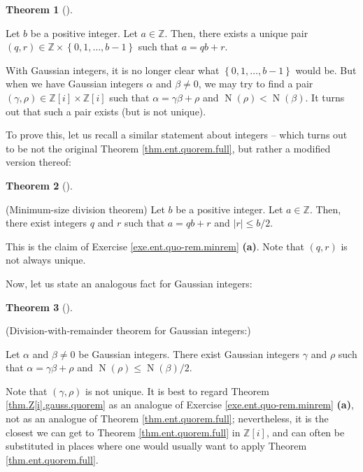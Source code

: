 \documentclass[numbers=enddot,12pt,final,onecolumn,notitlepage]{scrartcl}%
\numberwithin{exer}{subsection}
\theoremstyle{definition}
\newtheorem{theo}{Theorem}[subsection]
\newenvironment{theorem}[1][]
{\begin{theo}[#1]\begin{leftbar}}
{\end{leftbar}\end{theo}}
\begin{document}
\begin{theorem}
Let $b$ be a positive integer. Let $a\in\mathbb{Z}$. Then, there exists a
unique pair $\left(  q,r\right)  \in\mathbb{Z}\times\left\{  0,1,\ldots
,b-1\right\}  $ such that $a=qb+r$.
\end{theorem}

With Gaussian integers, it is no longer clear what $\left\{  0,1,\ldots
,b-1\right\}  $ would be. But when we have Gaussian integers $\alpha$ and
$\beta\neq0$, we may try to find a pair $\left(  \gamma,\rho\right)
\in\mathbb{Z}\left[  i\right]  \times\mathbb{Z}\left[  i\right]  $ such that
$\alpha=\gamma\beta+\rho$ and $\operatorname*{N}\left(  \rho\right)
<\operatorname*{N}\left(  \beta\right)  $. It turns out that such a pair
exists (but is not unique).

To prove this, let us recall a similar statement about integers -- which turns
out to be not the original Theorem \ref{thm.ent.quorem.full}, but rather a
modified version thereof:

\begin{theorem}
(Minimum-size division theorem) Let $b$ be a positive integer. Let
$a\in\mathbb{Z}$. Then, there exist integers $q$ and $r$ such that $a=qb+r$
and $\left\vert r\right\vert \leq b/2$.
\end{theorem}

This is the claim of Exercise \ref{exe.ent.quo-rem.minrem} \textbf{(a)}. Note
that $\left(  q,r\right)  $ is not always unique.

Now, let us state an analogous fact for Gaussian integers:

\begin{theorem}
\label{thm.Z[i].gauss.quorem}(Division-with-remainder theorem for Gaussian integers:)

Let $\alpha$ and $\beta\neq0$ be Gaussian integers. There exist Gaussian
integers $\gamma$ and $\rho$ such that $\alpha=\gamma\beta+\rho$ and
$\operatorname*{N}\left(  \rho\right)  \leq\operatorname*{N}\left(
\beta\right)  /2$.
\end{theorem}

Note that $\left(  \gamma,\rho\right)  $ is not unique. It is best to regard
Theorem \ref{thm.Z[i].gauss.quorem} as an analogue of Exercise
\ref{exe.ent.quo-rem.minrem} \textbf{(a)}, not as an analogue of Theorem
\ref{thm.ent.quorem.full}; nevertheless, it is the closest we can get to
Theorem \ref{thm.ent.quorem.full} in $\mathbb{Z}\left[  i\right]  $, and can
often be substituted in places where one would usually want to apply Theorem
\ref{thm.ent.quorem.full}.
\end{document}
